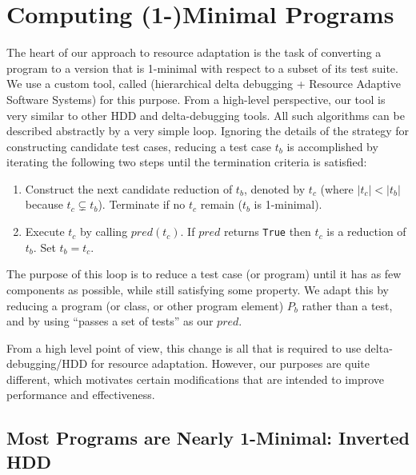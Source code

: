 \section{Computing (1-)Minimal Programs}

The heart of our approach to resource adaptation is the task of converting a
program to a version that is 1-minimal with respect to a subset of its test
suite.  We use a custom tool, called \mytool (hierarchical delta debugging +
Resource Adaptive Software Systems) for this purpose.  From a high-level
perspective, our tool is very similar to other HDD and delta-debugging tools.
All such algorithms can be described abstractly by a very simple loop.
Ignoring the details of the strategy for constructing candidate test cases,
reducing a test case $t_b$ is accomplished by iterating the following two steps
until the termination criteria is satisfied:

\begin{enumerate}
\item Construct the next candidate  reduction of $t_b$, denoted by
 $t_c$ (where $|t_c| < |t_b|$ because $t_c \subsetneq t_b$).  Terminate if no $t_c$ remain ($t_b$ is 1-minimal).
\item Execute $t_c$ by calling $\mathit{pred}(t_c)$.  If $\mathit{pred}$ returns {\tt True} then $t_c$ is a  reduction of $t_b$.  Set $t_b = t_c$.
\end{enumerate}

The purpose of this loop is to reduce a test case (or program) until it has as
few components as possible, while still satisfying some property.  We adapt this
by reducing a program (or class, or other program element) $P_b$ rather than a
test, and by using ``passes a set of tests'' as our $\mathit{pred}$.

From a high level point of view, this change is all that is required to use
delta-debugging/HDD for resource adaptation.  However, our purposes are quite
different, which motivates certain modifications that are intended to improve
performance and effectiveness.

\subsection{Most Programs are Nearly 1-Minimal: Inverted HDD}

